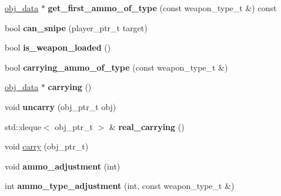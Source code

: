 \begin{DoxyCompactItemize}
\item 
\mbox{\label{classmods_1_1player_a3ee5b9cc2ec5bfcd3c4768831653c2c3}} 
\hyperlink{structobj__data}{obj\+\_\+data} $\ast$ {\bfseries get\+\_\+first\+\_\+ammo\+\_\+of\+\_\+type} (const weapon\+\_\+type\+\_\+t \&) const
\item 
\mbox{\label{classmods_1_1player_a7d3551cdfa6a862d263444343133ab52}} 
bool {\bfseries can\+\_\+snipe} (player\+\_\+ptr\+\_\+t target)
\item 
\mbox{\label{classmods_1_1player_ac61916af7f7983f789be3da07d8eef99}} 
bool {\bfseries is\+\_\+weapon\+\_\+loaded} ()
\item 
\mbox{\label{classmods_1_1player_a34eb82a07bfcf1cda938b295a263b692}} 
bool {\bfseries carrying\+\_\+ammo\+\_\+of\+\_\+type} (const weapon\+\_\+type\+\_\+t \&)
\item 
\mbox{\label{classmods_1_1player_a5500e30cd64d867671b0aeb1513a4dd9}} 
\hyperlink{structobj__data}{obj\+\_\+data} $\ast$ {\bfseries carrying} ()
\item 
\mbox{\label{classmods_1_1player_a29cd4d24ec21d08b01e6e4ea57d056ad}} 
void {\bfseries uncarry} (obj\+\_\+ptr\+\_\+t obj)
\item 
\mbox{\label{classmods_1_1player_a8f095a914b197c84ca48daa6f027d63f}} 
std\+::deque$<$ obj\+\_\+ptr\+\_\+t $>$ \& {\bfseries real\+\_\+carrying} ()
\item 
void \hyperlink{classmods_1_1player_a3dfd0e5a7bb17c98cfa5031b02620cbb}{carry} (obj\+\_\+ptr\+\_\+t)
\item 
\mbox{\label{classmods_1_1player_a24f37b27f2a8e2265c825b92dc9126f7}} 
void {\bfseries ammo\+\_\+adjustment} (int)
\item 
\mbox{\label{classmods_1_1player_a505508f9f4abf3d019137f56529cee2e}} 
int {\bfseries ammo\+\_\+type\+\_\+adjustment} (int, const weapon\+\_\+type\+\_\+t \&)
\item 
\mbox{\label{classmods_1_1player_a706d5f48fe7b8e3f3013e8a4e89026ea}} 

\end{DoxyCompactItemize}
